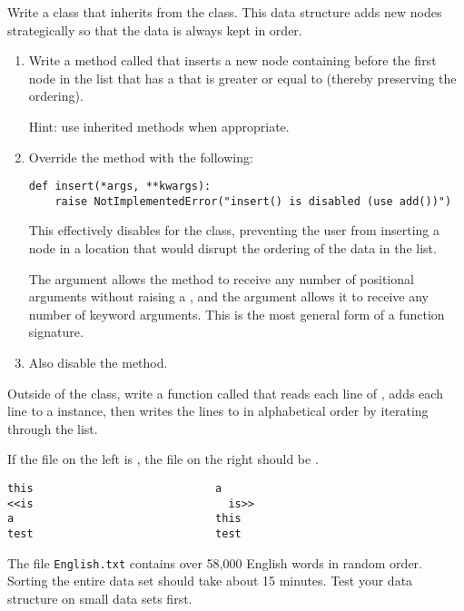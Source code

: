 \begin{problem}
Write a  class that inherits from the  class.
This data structure adds new nodes strategically so that the data is always kept in order.
\begin{enumerate}
\item Write a method called  that inserts a new node containing  before the first node in the list that has a  that is greater or equal to  (thereby preserving the ordering).

Hint: use inherited methods when appropriate.
\item Override the  method with the following:

\begin{lstlisting}
def insert(*args, **kwargs):
    raise NotImplementedError("insert() is disabled (use add())")
\end{lstlisting} %

This effectively disables  for the  class, preventing the user from inserting a node in a location that would disrupt the ordering of the data in the list.

\begin{info}
The  argument allows the  method to receive any number of positional arguments without raising a , and the  argument allows it to receive any number of keyword arguments.
This is the most general form of a function signature.
\end{info}

\item Also disable the  method.

\end{enumerate}
Outside of the class, write a function called  that reads each line of , adds each line to a  instance, then writes the lines to  in alphabetical order by iterating through the list.

If the file on the left is , the file on the right should be .
\begin{lstlisting}
this                            a
<<is                              is>>
a                               this
test                            test
\end{lstlisting}

\begin{warn} %
The file \texttt{English.txt} contains over 58,000 English words in random order.
Sorting the entire data set should take about 15 minutes.
Test your data structure on small data sets first.
\end{warn}
\label{prob:sortedlist}
\end{problem}

